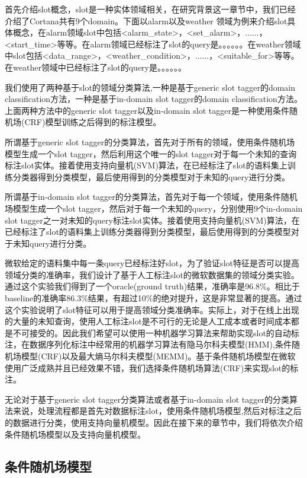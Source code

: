 \documentclass[master]{njuthesis}
\begin{document}
    首先介绍slot概念，slot是一种实体领域相关，在研究背景这一章节中，我们已经介绍了Cortana共有9个domain。下面以alarm以及weather 领域为例来介绍slot具体概念，在alarm领域slot中包括<alarm\_state>，<set\_alarm>，......，<start\_time>等等。在alarm领域已经标注了slot的query是。。。。。。在weather领域中slot包括<data\_range>，<weather\_condition>，......，<suitable\_for>等等。在weather领域中已经标注了slot的query是。。。。。。

    我们使用了两种基于slot的领域分类算法,一种是基于generic slot tagger的domain classification方法，一种是基于in-domain slot tagger的domain classification方法。上面两种方法中的generic slot tagger以及in-domain slot tagger是一种使用条件随机场(CRF)模型训练之后得到的标注模型。
    
    所谓基于generic slot tagger的分类算法，首先对于所有的领域，使用条件随机场模型生成一个slot tagger，然后利用这个唯一的slot tagger对于每一个未知的查询标注slot实体。接着使用支持向量机(SVM)算法，在已经标注了slot的语料集上训练分类器得到分类模型，最后使用得到的分类模型对于未知的query进行分类。

    所谓基于in-domain slot tagger的分类算法，首先对于每一个领域，使用条件随机场模型生成一个slot tagger，然后对于每一个未知的query，分别使用9个in-domain slot tagger之一对未知的query标注slot实体。接着使用支持向量机(SVM)算法，在已经标注了slot的语料集上训练分类器得到分类模型，最后使用得到的分类模型对于未知query进行分类。
    
    微软给定的语料集中每一条query已经标注好slot，为了验证slot特征是否可以提高领域分类的准确率，我们设计了基于人工标注slot的微软数据集的领域分类实验。通过这个实验我们得到了一个oracle(ground truth)结果，准确率是96.8\%。相比于baseline的准确率86.3\%结果，有超过10\%的绝对提升，这是非常显著的提高。通过这个实验说明了slot特征可以用于提高领域分类准确率。实际上，对于在线上出现的大量的未知查询，使用人工标注slot是不可行的无论是人工成本或者时间成本都是不可接受的。因此我们希望可以使用一种机器学习算法来帮助实现slot的自动标注，在数据序列化标注中经常用的机器学习算法有隐马尔科夫模型(HMM),条件随机场模型(CRF)以及最大熵马尔科夫模型(MEMM)。基于条件随机场模型在微软使用广泛成熟并且已经效果不错，我们选择条件随机场算法(CRF)来实现slot的标注。
    
    无论对于基于generic slot tagger分类算法或者基于in-domain slot tagger的分类算法来说，处理流程都是首先对数据标注slot，使用条件随机场模型,然后对标注之后的数据进行分类，使用支持向量机模型。因此在接下来的章节中，我们将依次介绍条件随机场模型以及支持向量机模型。

\subsection{条件随机场模型}
\end{document}

